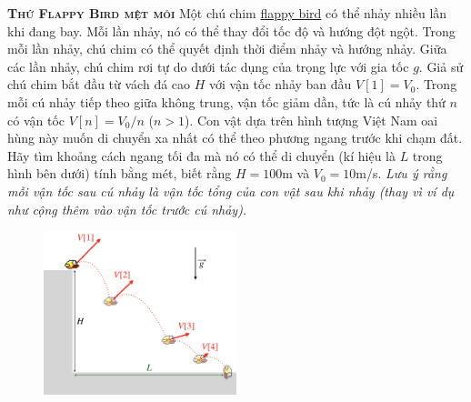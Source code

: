


\begin{problem}{\textbf{\textsc{Thứ Flappy Bird mệt mỏi}}} Một chú chim \href{https://flappybird.io/}{flappy bird} có thể nhảy nhiều lần khi đang bay. Mỗi lần nhảy, nó có thể thay đổi tốc độ và hướng đột ngột. Trong mỗi lần nhảy, chú chim có thể quyết định thời điểm nhảy và hướng nhảy. Giữa các lần nhảy, chú chim rơi tự do dưới tác dụng của trọng lực với gia tốc $g$. Giả sử chú chim bắt đầu từ vách đá cao $H$ với vận tốc nhảy ban đầu $V[1]=V_0$. Trong mỗi cú nhảy tiếp theo giữa không trung, vận tốc giảm dần, tức là cú nhảy thứ $n$ có vận tốc $V[n]=V_0/n$ ($n>1$). Con vật dựa trên hình tượng Việt Nam oai hùng này muốn di chuyển xa nhất có thể theo phương ngang trước khi chạm đất. Hãy tìm khoảng cách ngang tối đa mà nó có thể di chuyển (kí hiệu là $L$ trong hình bên dưới) tính bằng mét, biết rằng $H=100$m và $V_0=10$m/s. \textit{Lưu ý rằng mỗi vận tốc sau cú nhảy là vận tốc tổng của con vật sau khi nhảy (thay vì ví dụ như cộng thêm vào vận tốc trước cú nhảy).}
	
	\FloatBarrier
	\begin{figure}[!htbp]
		\centering
		\includegraphics[width=0.5\textwidth]{problems/figures/flappybird.png}
	\end{figure}
	\FloatBarrier
	
\end{problem}
